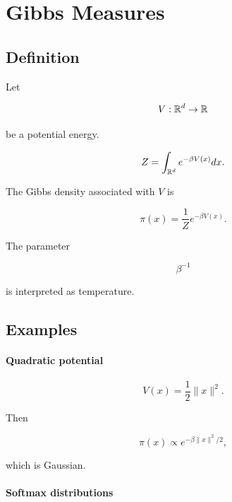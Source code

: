 \section{Gibbs Measures}

\subsection{Definition}

Let

\[
V:\mathbb{R}^d\to\mathbb{R}
\]

be a potential energy.

\begin{definition}

\[
Z
=
\int_{\mathbb{R}^d}
e^{-\beta V(x)}
dx.
\]

\end{definition}

\begin{definition}

The Gibbs density associated with $V$ is

\[
\pi(x)
=
\frac1Z
e^{-\beta V(x)}.
\]

\end{definition}

\begin{remark}

The parameter

\[
\beta^{-1}
\]

is interpreted as temperature.

\end{remark}

\subsection{Examples}

\paragraph{Quadratic potential}

\[
V(x)
=
\frac12\|x\|^2.
\]

Then

\[
\pi(x)
\propto
e^{-\beta \|x\|^2/2},
\]

which is Gaussian.

\paragraph{Softmax distributions}

